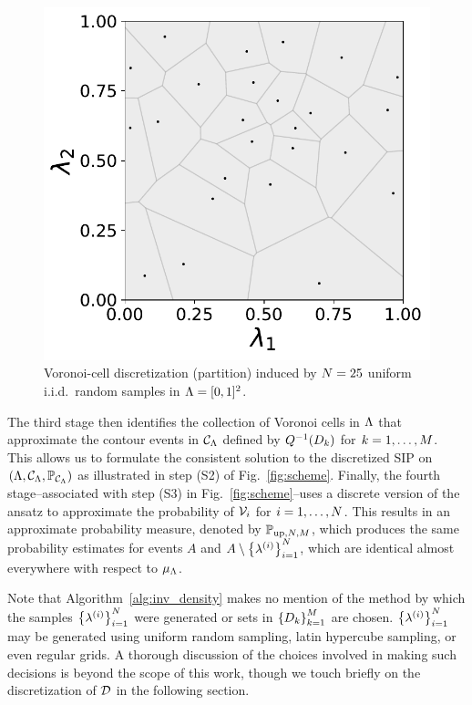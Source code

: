 \begin{figure}[ht]
\centering
	\begin{minipage}{.475\textwidth}
		\includegraphics[width=\linewidth]{./images/voronoi_diagrams/voronoi_diagram_N25_r0}
	\end{minipage}
\caption{
Voronoi-cell discretization (partition) induced by $N = 25 $ uniform i.i.d.~random samples in ${\Lambda} = [0,1]^2$.
}
\label{fig:voronoi_cells}
\end{figure}

The third stage then identifies the collection of Voronoi cells in ${\Lambda}$ that approximate the contour events in $\mathcal{C}_{{\Lambda}}$ defined by $Q^{-1}(D_k)$ for $k=1,\hdots,M$. This allows us to formulate the consistent solution to the discretized SIP on $({\Lambda}, \mathcal{C}_{{\Lambda}}, \operatorname*{\mathbb{P}_{\mathcal{C}_{{\Lambda}}}})$ as illustrated in step (S2) of Fig.~\ref{fig:scheme}.
Finally, the fourth stage\---associated with step (S3) in Fig.~\ref{fig:scheme}\---uses a discrete version of the ansatz to approximate the probability of $\mathcal{V}_i$ for $i=1,\dots,N$.
This results in an approximate probability measure, denoted by $\mathbb{P}_{\text{up},N,M}$, which produces the same probability estimates for events $A$ and $A\setminus \left\{ \lambda^{(i)} \right\}_{i=1}^N$, which are identical almost everywhere with respect to $\mu_{{\Lambda}}$.

Note that Algorithm~\ref{alg:inv_density} makes no mention of the method by which the samples $\left\{ \lambda^{(i)} \right\}_{i=1}^{N}$ were generated or sets in $\left\{D_k\right\}_{k=1}^{M}$ are chosen.
$\left\{ \lambda^{(i)} \right\}_{i=1}^{N}$ may be generated using uniform random sampling, latin hypercube sampling, or even regular grids.
A thorough discussion of the choices involved in making such decisions is beyond the scope of this work, though we touch briefly on the discretization of $\mathcal{D}$ in the following section.
